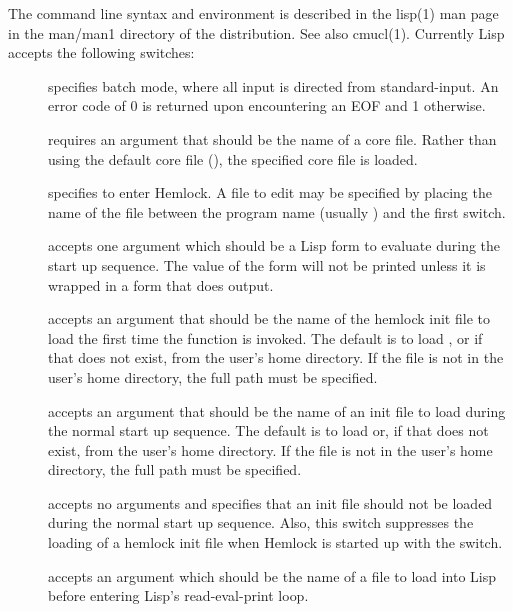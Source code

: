 The command line syntax and environment is described in the lisp(1) man page in
the man/man1 directory of the distribution.  See also cmucl(1).
Currently Lisp accepts the following switches:
\begin{description}

\item[] specifies batch mode, where all input is directed
from standard-input.  An error code of 0 is returned upon
encountering an EOF and 1 otherwise.

\item[] requires an argument that should be the name of a
core file.  Rather than using the default core file
(), the specified core file is
loaded.

\item[] specifies to enter Hemlock.  A file to edit may be
specified by placing the name of the file between the program name
(usually ) and the first switch.

\item[]
accepts one argument which should be a Lisp form to evaluate during
the start up sequence.  The value of the form will not be printed unless it is
wrapped in a form that does output.

\item[]
accepts an argument that should be the name of
the hemlock init file to load the first time the function
 is invoked.  The default is to load
, or if that does not
exist,  from the user's home directory.  If
the file is not in the user's home directory, the full path must be
specified.

\item[] accepts an argument that should be the name of an
init file to load during the normal start up sequence.  The default is
to load  or, if that does not exist,
 from the user's home directory.  If the file is not in
the user's home directory, the full path must be specified.

\item[]
accepts no arguments and specifies that an init file should not
be loaded during the normal start up sequence.  Also, this switch
suppresses the loading of a hemlock init file when Hemlock is started up
with the  switch.

\item[]
accepts an argument which should be the name of a file to load
into Lisp before entering Lisp's read-eval-print loop.


\end{description}
